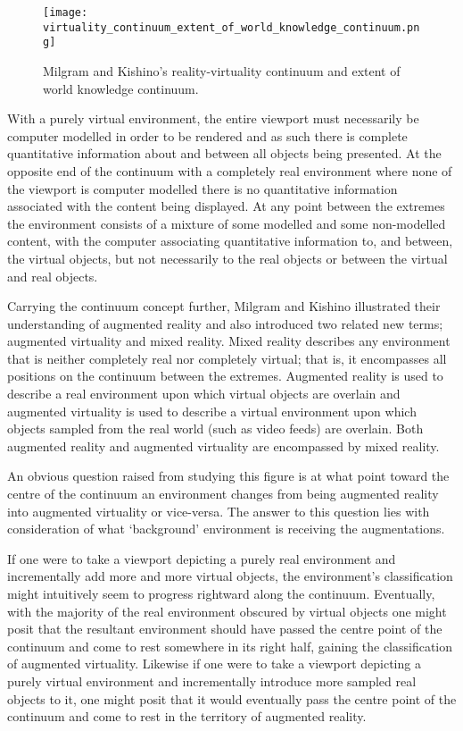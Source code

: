 \begin{figure}[h]
\centering
\texttt{[image: virtuality\_continuum\_extent\_of\_world\_knowledge\_continuum.png]}
\caption{Milgram and Kishino's reality-virtuality continuum and extent of world knowledge continuum.}
\label{reality_virtuality_extent_of_world_knowledge_continuum}
\end{figure}

With a purely virtual environment, the entire viewport must necessarily be computer modelled in order to be rendered and as such there is complete quantitative information about and between all objects being presented. At the opposite end of the continuum with a completely real environment where none of the viewport is computer modelled there is no quantitative information associated with the content being displayed. At any point between the extremes the environment consists of a mixture of some modelled and some non-modelled content, with the computer associating quantitative information to, and between, the virtual objects, but not necessarily to the real objects or between the virtual and real objects.

Carrying the continuum concept further, Milgram and Kishino illustrated their understanding of augmented reality and also introduced two related new terms; augmented virtuality and mixed reality. Mixed reality describes any environment that is neither completely real nor completely virtual; that is, it encompasses all positions on the continuum between the extremes. Augmented reality is used to describe a real environment upon which virtual objects are overlain and augmented virtuality is used to describe a virtual environment upon which objects sampled from the real world (such as video feeds) are overlain. Both augmented reality and augmented virtuality are encompassed by mixed reality.

An obvious question raised from studying this figure is at what point toward the centre of the continuum an environment changes from being augmented reality into augmented virtuality or vice-versa. The answer to this question lies with consideration of what `background' environment is receiving the augmentations.

If one were to take a viewport depicting a purely real environment and incrementally add more and more virtual objects, the environment's classification might intuitively seem to progress rightward along the continuum. Eventually, with the majority of the real environment obscured by virtual objects one might posit that the resultant environment should have passed the centre point of the continuum and come to rest somewhere in its right half, gaining the classification of augmented virtuality. Likewise if one were to take a viewport depicting a purely virtual environment and incrementally introduce more sampled real objects to it, one might posit that it would eventually pass the centre point of the continuum and come to rest in the territory of augmented reality.

